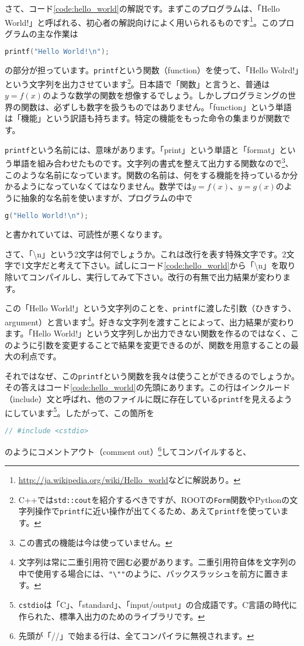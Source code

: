 さて、コード\ref{code:hello_world}の解説です。まずこのプログラムは、「Hello World!」と呼ばれる、初心者の解説向けによく用いられるものです\footnote{\url{http://ja.wikipedia.org/wiki/Hello_world}などに解説あり。}。このプログラムの主な作業は
\begin{lstlisting}[language=c++]
  printf("Hello World!\n");
\end{lstlisting}
の部分が担っています。\texttt{printf}という関数（function）を使って、「Hello Wolrd!」という文字列を出力させています\footnote{C++では\texttt{std::cout}を紹介するべきですが、ROOTの\texttt{Form}関数やPythonの文字列操作で\texttt{printf}に近い操作が出てくるため、あえて\texttt{printf}を使っています。}。日本語で「関数」と言うと、普通は$y=f(x)$のような数学の関数を想像するでしょう。しかしプログラミングの世界の関数は、必ずしも数字を扱うものではありません。「function」という単語は「機能」という訳語も持ちます。特定の機能をもった命令の集まりが関数です。

\texttt{printf}という名前には、意味があります。「print」という単語と「format」という単語を組み合わせたものです。文字列の書式を整えて出力する関数なので\footnote{この書式の機能は今は使っていません。}、このような名前になっています。関数の名前は、何をする機能を持っているか分かるようになっていなくてはなりません。数学では$y=f(x)$、$y=g(x)$のように抽象的な名前を使いますが、プログラムの中で
\begin{lstlisting}[language=c++]
  g("Hello World!\n");
\end{lstlisting}
と書かれていては、可読性が悪くなります。

さて、「\textbackslash n」という2文字は何でしょうか。これは改行を表す特殊文字です。2文字で1文字だと考えて下さい。試しにコード\ref{code:hello_world}から「\textbackslash n」を取り除いてコンパイルし、実行してみて下さい。改行の有無で出力結果が変わります。

この「Hello World!」という文字列のことを、\texttt{printf}に渡した引数（ひきすう、argument）と言います\footnote{文字列は常に二重引用符で囲む必要があります。二重引用符自体を文字列の中で使用する場合には、\texttt{"\textbackslash ""}のように、バックスラッシュを前方に置きます。}。好きな文字列を渡すことによって、出力結果が変わります。「Hello World!」という文字列しか出力できない関数を作るのではなく、このように引数を変更することで結果を変更できるのが、関数を用意することの最大の利点です。

それではなぜ、この\texttt{printf}という関数を我々は使うことができるのでしょうか。その答えはコード\ref{code:hello_world}の先頭にあります。この行はインクルード（include）文と呼ばれ、他のファイルに既に存在している\texttt{printf}を見えるようにしています\footnote{\texttt{cstdio}は「C」、「standard」、「input/output」の合成語です。C言語の時代に作られた、標準入出力のためのライブラリです。}。したがって、この箇所を
\begin{lstlisting}[language=c++]
// #include <cstdio>
\end{lstlisting}
のようにコメントアウト（comment out）\footnote{先頭が「//」で始まる行は、全てコンパイラに無視されます。}してコンパイルすると、

